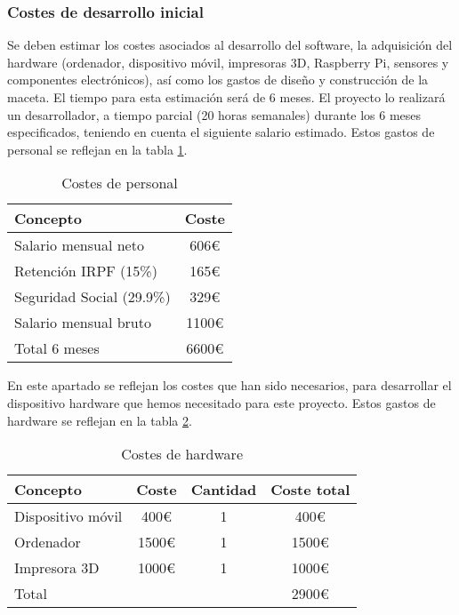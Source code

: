         \subsubsection{Costes de desarrollo inicial}
        Se deben estimar los costes asociados al desarrollo del software, la adquisición del hardware (ordenador, dispositivo móvil, impresoras 3D, Raspberry Pi, sensores y componentes electrónicos), así como los gastos de diseño y construcción de la maceta. El tiempo para esta estimación será de 6 meses.
            El proyecto lo realizará un desarrollador, a tiempo parcial (20 horas semanales) durante los 6 meses especificados, teniendo en cuenta el siguiente salario estimado. Estos gastos de personal se reflejan en la tabla \ref{tab:costes de personal de desarrollo inicial}.
            \begin{table}[H]
                \centering
                \caption{Costes de personal}
                \begin{tabular}{|l|c|}
                    \hline
                    Concepto & Coste \\
                    \hline
                    Salario mensual neto & 606€ \\
                    Retención IRPF (15\%) & 165€ \\
                    Seguridad Social (29.9\%) & 329€ \\
                    \hline
                    Salario mensual bruto & 1100€ \\
                    \hline
                    Total 6 meses & 6600€ \\
                    \hline
                \end{tabular}
                \label{tab:costes de personal de desarrollo inicial}
            \end{table}
            En este apartado se reflejan los costes que han sido necesarios, para desarrollar el dispositivo hardware que hemos necesitado para este proyecto. Estos gastos de hardware se reflejan en la tabla \ref{tab:costes de hardware de desarrollo inicial}.
            \begin{table}[H]
                \centering
                \caption{Costes de hardware}
                \begin{tabular}{|l|c|c|c|}
                    \hline
                    Concepto & Coste & Cantidad & Coste total \\
                    \hline
                    Dispositivo móvil & 400€ & 1 & 400€ \\
                    Ordenador & 1500€ & 1 & 1500€ \\
                    Impresora 3D & 1000€ & 1 & 1000€ \\
                    \hline
                    Total & & & 2900€ \\
                    \hline
                \end{tabular}
                \label{tab:costes de hardware de desarrollo inicial}
            \end{table}
